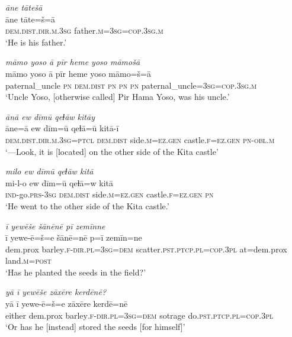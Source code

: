 \ea \label{ŽP.7}
\textit{āne tātešā} \\ 
\gll āne tāte=š=ā \\ 
 \textsc{dem.dist}\textsc{.dir}\textsc{.m}\textsc{.3sg} father\textsc{.m}\textsc{=3sg}\textsc{=cop}\textsc{.3sg}\textsc{.m} \\ 
\glt `He is his father.'
\z 
 
\ea \label{ŽP.12}
\textit{māmo yoso ā pīr heme yoso māmošā} \\ 
\gll māmo yoso ā pīr heme yoso māmo=š=ā \\ 
 paternal\_uncle \textsc{pn} \textsc{dem.dist} \textsc{pn} \textsc{pn} \textsc{pn} paternal\_uncle\textsc{=3sg}\textsc{=cop}\textsc{.3sg}\textsc{.m} \\ 
\glt `Uncle Yoso, [otherwise called] Pir Hama Yoso, was his uncle.'
\z 
 
\ea \label{ŽP.19}
\textit{ānā ew dīmū qeɫāw kitāy} \\ 
\gll āne=ā ew dīm=ū qeɫā=ū kitā-ī \\ 
 \textsc{dem.dist}\textsc{.dir}\textsc{.m}\textsc{.3sg}=\textsc{ptcl} \textsc{dem.dist} side\textsc{.m}\textsc{\textsc{=ez.gen}} castle\textsc{.f}\textsc{\textsc{=ez.gen}} \textsc{pn}\textsc{-obl}\textsc{.m} \\ 
\glt `—Look, it is [located] on the other side of the Kita castle'
\z 
 
\ea \label{ŽP.31}
\textit{milo ew dīmū qeɫāw kitā} \\ 
\gll mi-l-o ew dīm=ū qeɫā=w kitā \\ 
 \textsc{ind-}go\textsc{.prs}\textsc{-3sg} \textsc{dem.dist} side\textsc{.m}\textsc{\textsc{=ez.gen}} castle\textsc{.f}\textsc{\textsc{=ez.gen}} \textsc{pn} \\ 
\glt `He went to the other side of the Kita castle.'
\z 
 
\ea \label{ŽP.44}
\textit{ī yewēše šānēnē pī zemīnne} \\ 
\gll ī yewe-ē=š=e šānē=nē p=ī zemīn=ne \\ 
 dem.prox barley\textsc{.f}\textsc{-dir}\textsc{.pl}\textsc{=3sg}\textsc{=dem} scatter\textsc{.pst}\textsc{.ptcp}\textsc{.pl}\textsc{=cop}\textsc{.3pl} at=dem.prox land\textsc{.m}\textsc{=\textsc{post}} \\ 
\glt `Has he planted the seeds in the field?'
\z 
 
\ea \label{ŽP.45}
\textit{yā ī yewēše zāxēre kerdēnē?} \\ 
\gll yā ī yewe-ē=š=e zāxēre kerdē=nē \\ 
 either dem.prox barley\textsc{.f}\textsc{-dir}\textsc{.pl}\textsc{=3sg}\textsc{=dem} sotrage do\textsc{.pst}\textsc{.ptcp}\textsc{.pl}\textsc{=cop}\textsc{.3pl} \\ 
\glt `Or has he [instead] stored the seeds [for himself]'
\z 
 
